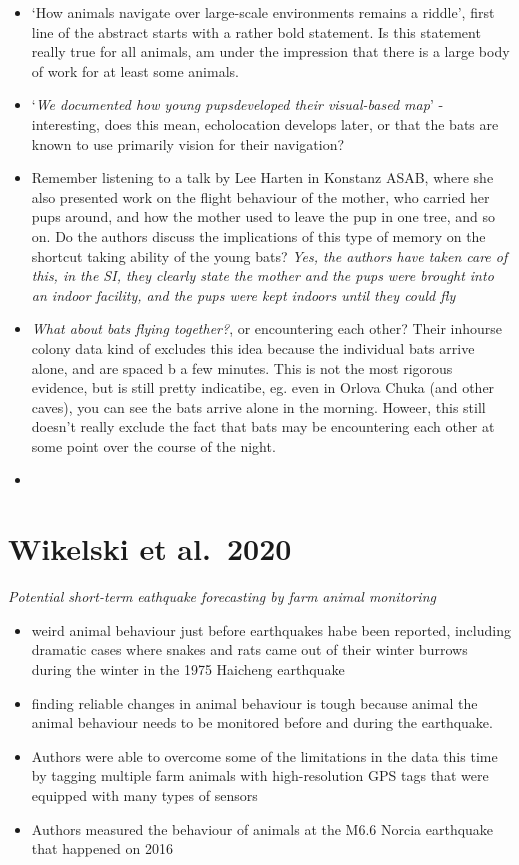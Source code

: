 \documentclass[
]{book}
\providecommand{\tightlist}{%
  \setlength{\itemsep}{0pt}\setlength{\parskip}{0pt}}
\begin{document}
\begin{itemize}
\tightlist
\item
  `How animals navigate over large-scale environments remains a riddle', first line of the abstract starts with a rather bold statement. Is this statement really true for all animals, am under the impression that there is a large body of work for at least some animals.
\item
  `\emph{We documented how young pupsdeveloped their visual-based map}' - interesting, does this mean, echolocation develops later, or that the bats are known to use primarily vision for their navigation?
\item
  Remember listening to a talk by Lee Harten in Konstanz ASAB, where she also presented work on the flight behaviour of the mother, who carried her pups around, and how the mother used to leave the pup in one tree, and so on. Do the authors discuss the implications of this type of memory on the shortcut taking ability of the young bats? \emph{Yes, the authors have taken care of this, in the SI, they clearly state the mother and the pups were brought into an indoor facility, and the pups were kept indoors until they could fly}
\item
  \emph{What about bats flying together?}, or encountering each other? Their inhourse colony data kind of excludes this idea because the individual bats arrive alone, and are spaced b a few minutes. This is not the most rigorous evidence, but is still pretty indicatibe, eg. even in Orlova Chuka (and other caves), you can see the bats arrive alone in the morning. Howeer, this still doesn't really exclude the fact that bats may be encountering each other at some point over the course of the night.
\item
\end{itemize}

\hypertarget{wikelskiearthquake}{%
\chapter{Wikelski et al.~2020}\label{wikelskiearthquake}}

\emph{Potential short-term eathquake forecasting by farm animal monitoring} \citep{wikelskiearthquake2020}

\begin{itemize}
\item
  weird animal behaviour just before earthquakes habe been reported, including dramatic cases where snakes and rats came out of their winter burrows during the winter in the 1975 Haicheng earthquake
\item
  finding reliable changes in animal behaviour is tough because animal the animal behaviour needs to be monitored before and during the earthquake.
\item
  Authors were able to overcome some of the limitations in the data this time by tagging multiple farm animals with high-resolution GPS tags that were equipped with many types of sensors
\item
  Authors measured the behaviour of animals at the M6.6 Norcia earthquake that happened on 2016
\end{itemize}
\end{document}
